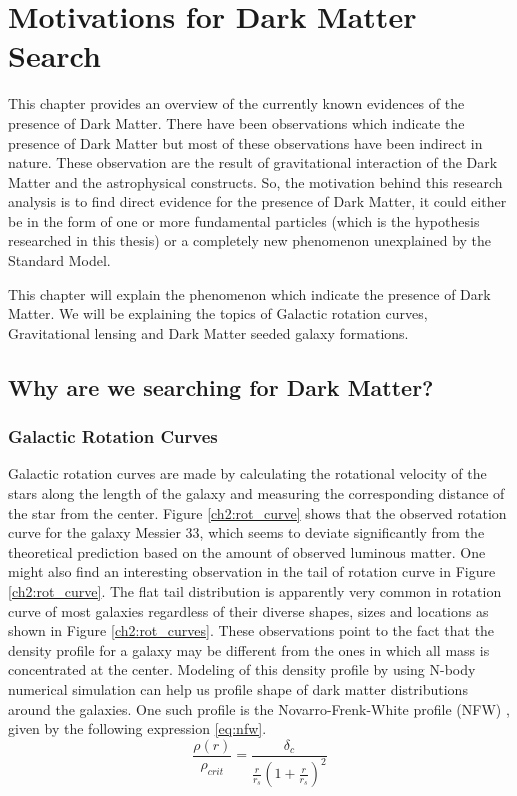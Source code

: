 \chapter{Motivations for Dark Matter Search}
\label{chapter:two}

This chapter provides an overview of the currently known evidences of the presence of Dark Matter. There have been observations which indicate the presence of Dark Matter but most of these observations have been indirect in nature. These observation are the result of gravitational interaction of the Dark Matter and the astrophysical constructs. So, the motivation behind this research analysis is to find direct evidence for the presence of Dark Matter, it could either be in the form of one or more fundamental particles (which is the hypothesis researched in this thesis) or a completely new phenomenon unexplained by the Standard Model.

This chapter will explain the phenomenon which indicate the presence of Dark Matter. We will be explaining the topics of Galactic rotation curves, Gravitational lensing and Dark Matter seeded galaxy formations.
\section{Why are we searching for Dark Matter?}

\subsection{Galactic Rotation Curves}
Galactic rotation curves are made by calculating the rotational velocity of the stars along the length of the galaxy and measuring the corresponding distance of the star from the center. Figure \ref{ch2:rot_curve} shows that the observed rotation curve for the galaxy Messier 33, which seems to deviate significantly from the theoretical prediction based on the amount of observed luminous matter. One might also find an interesting observation in the tail of rotation curve in Figure  \ref{ch2:rot_curve}. The flat tail distribution is apparently very common in rotation curve of most galaxies regardless of their diverse shapes, sizes and locations as shown in Figure \ref{ch2:rot_curves}. These observations point to the fact that the density profile for a galaxy may be different from the ones in which all mass is concentrated at the center. Modeling of this density profile by using N-body numerical simulation can help us profile shape of dark matter distributions around the galaxies. One such profile is the Novarro-Frenk-White profile (NFW) \cite{ch2:Navarro_1997}, given by the following expression \ref{eq:nfw}.
\begin{equation}
\frac{\rho(r)}{\rho_{crit}} = \frac{\delta_{c}}{\frac{r}{r_{s}} \left(1+ \frac{r}{r_{s}}\right)^{2}}
  \label{eq:nfw}
\end{equation}

